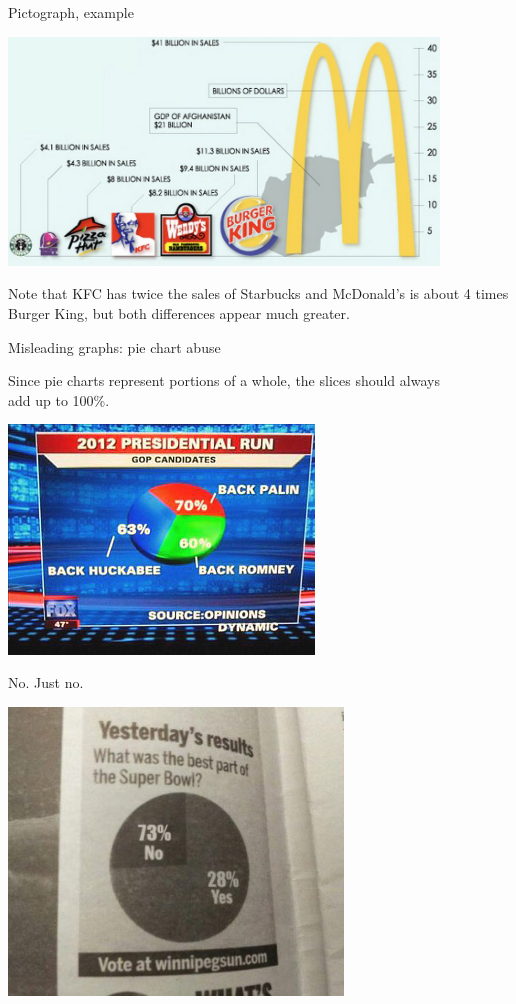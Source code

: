 \documentclass[]{beamer}
\begin{document}
\begin{frame}{Pictograph, example}
\begin{center}
\includegraphics[width=4.5in]{../images/ch02_fastfood_pictograph}
\end{center}
\begin{block}{}
Note that KFC has twice the sales of Starbucks and McDonald's is about 4 times Burger King, but both differences appear much greater.
\end{block}
\end{frame}

\begin{frame}{Misleading graphs: pie chart abuse}
\begin{block}{}
Since pie charts represent portions of a whole, the slices should always\\ add up to 100\%.
\end{block}
\pause
\begin{center}
\includegraphics[width=3.2in]{../images/ch02_bad_piechart}
\end{center}

\end{frame}

\begin{frame}{No. Just no.}
\begin{center}
\includegraphics[width=3.5in]{../images/ch02_sb_piechart}
\end{center}
\end{frame}
\end{document}
